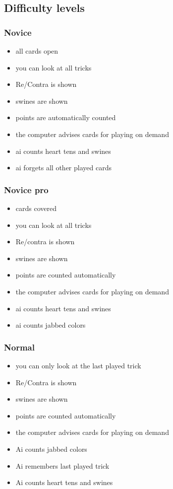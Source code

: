 \documentclass[12pt,a4paper]{article}
\begin{document}
\subsection{Difficulty levels}
\subsubsection{Novice}
\begin{itemize}
\item all cards open
\item you can look at all tricks
\item Re/Contra is shown
\item swines are shown
\item points are automatically counted
\item the computer advises cards for playing on demand
\item ai counts heart tens and swines
\item ai forgets all other played cards
\end{itemize}
\subsubsection{Novice pro}
\begin{itemize}
\item cards covered
\item you can look at all tricks
\item Re/contra is shown
\item swines are shown
\item points are counted automatically
\item the computer advises cards for playing on demand
\item ai counts heart tens and swines
\item ai counts jabbed colors
\end{itemize}
\subsubsection{Normal}
\begin{itemize}
\item you can only look at the last played trick
\item Re/Contra is shown
\item swines are shown
\item points are counted automatically
\item the computer advises cards for playing on demand
\item Ai counts jabbed colors
\item Ai remembers last played trick
\item Ai counts heart tens and swines
\end{itemize}
\end{document}

